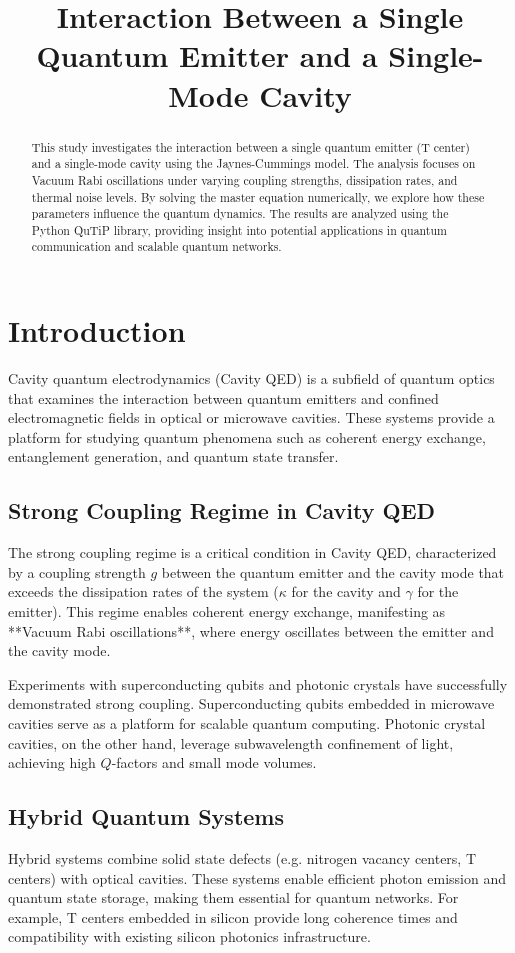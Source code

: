 \documentclass[conference]{IEEEtran}
\title{Interaction Between a Single Quantum Emitter and a Single-Mode Cavity}
\author{\IEEEauthorblockN{Ziyu Zhou}
\IEEEauthorblockA{
Department of Electrical and Computer Engineering\\
Rice University, Houston, TX, USA\\
Email: zz107@rice.edu}
}
\begin{document}
\maketitle

\begin{abstract}
This study investigates the interaction between a single quantum emitter (T center) and a single-mode cavity using the Jaynes-Cummings model. The analysis focuses on Vacuum Rabi oscillations under varying coupling strengths, dissipation rates, and thermal noise levels. By solving the master equation numerically, we explore how these parameters influence the quantum dynamics. The results are analyzed using the Python QuTiP library, providing insight into potential applications in quantum communication and scalable quantum networks.
\end{abstract}

\section{Introduction}

Cavity quantum electrodynamics (Cavity QED) is a subfield of quantum optics that examines the interaction between quantum emitters and confined electromagnetic fields in optical or microwave cavities. These systems provide a platform for studying quantum phenomena such as coherent energy exchange, entanglement generation, and quantum state transfer.

\subsection{Strong Coupling Regime in Cavity QED}
The strong coupling regime is a critical condition in Cavity QED, characterized by a coupling strength $g$ between the quantum emitter and the cavity mode that exceeds the dissipation rates of the system ($\kappa$ for the cavity and $\gamma$ for the emitter). This regime enables coherent energy exchange, manifesting as **Vacuum Rabi oscillations**, where energy oscillates between the emitter and the cavity mode.

Experiments with superconducting qubits and photonic crystals have successfully demonstrated strong coupling. Superconducting qubits embedded in microwave cavities serve as a platform for scalable quantum computing. Photonic crystal cavities, on the other hand, leverage subwavelength confinement of light, achieving high $Q$-factors and small mode volumes.

\subsection{Hybrid Quantum Systems}
Hybrid systems combine solid state defects (e.g. nitrogen vacancy centers, T centers) with optical cavities. These systems enable efficient photon emission and quantum state storage, making them essential for quantum networks. For example, T centers embedded in silicon provide long coherence times and compatibility with existing silicon photonics infrastructure.
\end{document}
